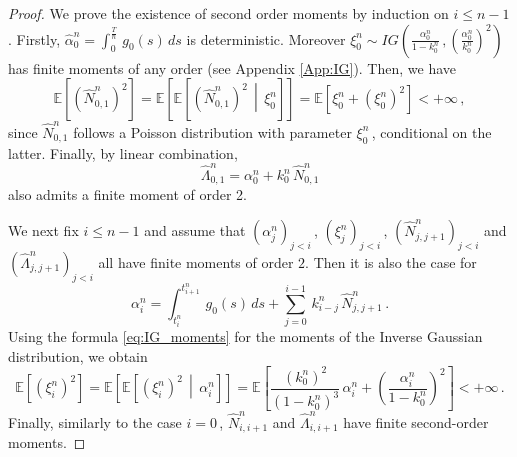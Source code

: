 \documentclass{article}
\newcommand{\1}{\mathbbm{1}}
\numberwithin{equation}{section}
\begin{document}
\begin{proof}
    We prove the existence of second order moments by induction on $i \leq n-1\,$. Firstly, $\widehat \alpha^n_0 = \int_0^{\frac T n}\, g_0(s)\,ds$ is deterministic. Moreover $ \xi^n_0 \sim IG\left(\frac{\alpha^n_0}{1 - k_0^n}\,, \left( \frac{\alpha^n_0}{ k_0^n}\right)^2\right)$ has finite moments of any order (see Appendix \ref{App:IG}). Then, we have
    $$
    \mathbb E \left[\left(\widehat N^n_{0,1}\right)^2 \right] = \mathbb E \left[\mathbb E \left[\left(\widehat N^n_{0,1}\right)^2\,\middle|\,\xi^n_0 \right] \right] = \mathbb E \left[\xi^n_0 + \left(\xi^n_0\right)^2\right] < + \infty \,,
    $$
    since $\widehat N^n_{0,1}$ follows a Poisson distribution with parameter $\xi^n_0\,$, conditional on the latter. Finally, by linear combination,
    $$
    \widehat \Lambda^n_{0,1} = \alpha^n_0 + k_0^n\,\widehat N^n_{0,1}
    $$
    also admits a finite moment of order 2.

    We next fix $i \leq n-1$ and assume that $\left(\alpha^n_j\right)_{j < i}\,$, $\left(\xi^n_j\right)_{j < i}\,$, $\left(\widehat N^n_{j,j+1}\right)_{j < i}$ and $\left(\widehat \Lambda^n_{j,j+1}\right)_{j <i}$ all have finite moments of order $2$. Then it is also the case for 
    $$
    \alpha^n_i = \int_{t^n_i}^{t^n_{i+1}}\,g_0(s)\,ds + \sum_{j = 0}^{i-1}\, k^n_{i-j}\, \widehat N^n_{j,j+1}\,.
    $$
    Using the formula \eqref{eq:IG_moments} for the moments of the Inverse Gaussian distribution, we obtain
    $$
    \mathbb E \left[\left(\xi^n_i\right)^2 \right] = \mathbb E \left[\mathbb E \left[\left(\xi^n_i\right)^2\,\middle|\,\alpha^n_i \right] \right] = \mathbb E \left[\frac{\left(k_0^n\right)^2}{\left(1 - k_0^n\right)^3}\,\alpha^n_i + \left(\frac{\alpha^n_i}{1 - k_0^n} \right)^2 \right] <+ \infty\,.
    $$
    Finally, similarly to the case $i = 0\,$, $\widehat N^n_{i,i+1}$ and $\widehat \Lambda^n_{i,i+1}$ have finite second-order moments.



\end{proof}
\end{document}
